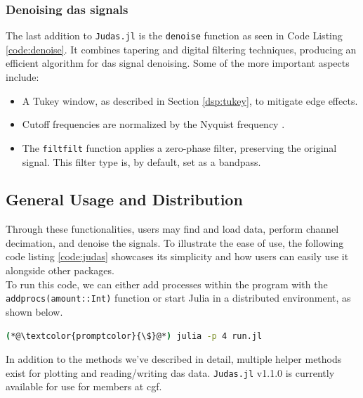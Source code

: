 

\clearpage
\subsubsection{Denoising \acrshort{das} signals}



The last addition to \texttt{Judas.jl} is the \texttt{denoise} function as seen in Code Listing \ref{code:denoise}. It combines tapering and digital filtering techniques, producing an efficient algorithm for \acrshort{das} signal denoising. Some of the more important aspects include: 

\begin{itemize}
    \item A Tukey window, as described in Section \ref{dsp:tukey}, to mitigate edge effects.
    \item Cutoff frequencies are normalized by the Nyquist frequency \cite{schmogrow2012nyquist}.
    \item The \texttt{filtfilt} function applies a zero-phase filter, preserving the original signal. This filter type is, by default, set as a bandpass. 
\end{itemize}

\clearpage
\subsection{General Usage and Distribution}

Through these functionalities, users may find and load data, perform channel decimation, and denoise the signals. To illustrate the ease of use, the following code listing \ref{code:judas} showcases its simplicity and how users can easily use it alongside other packages. \\



To run this code, we can either add processes within the program with the \texttt{addprocs(amount::Int)} function or start Julia in a distributed environment, as shown below.

\begin{lstlisting}[style=shellcommand, language=bash, label={code:judasrun}]
(*@\textcolor{promptcolor}{\$}@*) julia -p 4 run.jl
\end{lstlisting}

In addition to the methods we've described in detail, multiple helper methods exist for plotting and reading/writing \acrshort{das} data. \texttt{Judas.jl} v1.1.0 is currently available for use for members at \acrshort{cgf}. 


